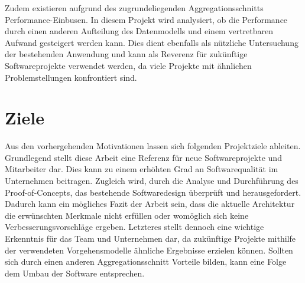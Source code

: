 Zudem existieren aufgrund des zugrundeliegenden Aggregationsschnitts Performance-Einbusen. In diesem Projekt wird analysiert, ob die Performance durch einen anderen Aufteilung des Datenmodells und einem vertretbaren Aufwand gesteigert werden kann. Dies dient ebenfalls als nützliche Untersuchung der bestehenden Anwendung und kann als Reverenz für zukünftige Softwareprojekte verwendet werden, da viele Projekte mit ähnlichen Problemstellungen konfrontiert sind.



\section{Ziele}


Aus den vorhergehenden Motivationen lassen sich folgenden Projektziele ableiten. Grundlegend stellt diese Arbeit eine Referenz für neue Softwareprojekte und Mitarbeiter dar. Dies kann zu einem erhöhten Grad an Softwarequalität im Unternehmen beitragen. Zugleich wird, durch die Analyse und Durchführung des Proof-of-Concepts, das bestehende Softwaredesign überprüft und herausgefordert. Dadurch kann ein mögliches Fazit der Arbeit sein, dass die aktuelle Architektur die erwünschten Merkmale nicht erfüllen oder womöglich sich keine Verbesserungsvorschläge ergeben. Letzteres stellt dennoch eine wichtige Erkenntnis für das Team und Unternehmen dar, da zukünftige Projekte mithilfe der verwendeten Vorgehensmodelle ähnliche Ergebnisse erzielen können. Sollten sich durch einen anderen Aggregationsschnitt Vorteile bilden, kann eine Folge dem Umbau der Software entsprechen.
